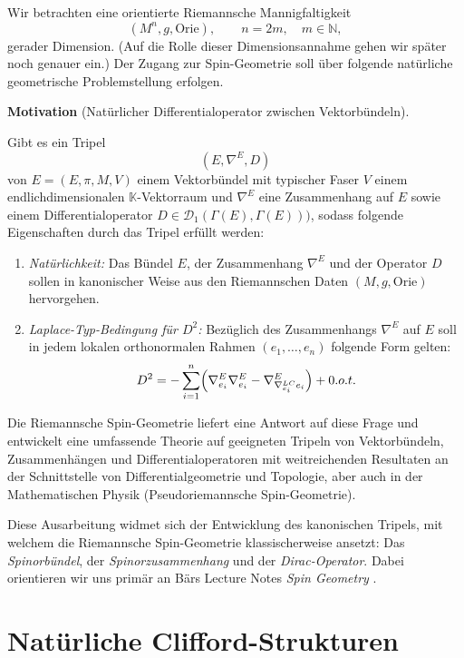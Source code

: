 \documentclass[10pt, letterpaper]{article}
\newcommand{\CustomHeading}[3]{%
  \par\medskip\noindent%
  \textbf{#1 #2} \textnormal{(#3)}.\enskip%
}
\newenvironment{MOT}[2]{\CustomHeading{Motivation}{#1}{#2}}{}
\begin{document}
Wir betrachten eine orientierte Riemannsche Mannigfaltigkeit
\[
(M^n,g,\mathrm{Orie}),
\qquad n=2m,\quad m\in\mathbb N,
\]
gerader Dimension. 
(Auf die Rolle dieser Dimensionsannahme gehen wir später noch genauer ein.) Der Zugang zur Spin-Geometrie soll über folgende natürliche geometrische Problemstellung erfolgen.

\begin{MOT}{}{Natürlicher Differentialoperator zwischen Vektorbündeln}
  Gibt es ein Tripel 
  $$\left( E,\nabla^E, D \right)$$
  von $E=(E,\pi,M,V)$ einem Vektorbündel mit typischer Faser $V$ einem endlichdimensionalen $\mathbb{K}$-Vektorraum und $\nabla^E$ eine Zusammenhang auf $E$ sowie einem Differentialoperator $D\in \mathscr{D}_1(\Gamma(E),\Gamma(E)))$, sodass folgende Eigenschaften durch das Tripel erfüllt werden:
  \begin{enumerate}
    \item \emph{Natürlichkeit:}
    Das Bündel $E$, der Zusammenhang $\nabla^E$ und der Operator $D$ sollen
    in kanonischer Weise aus den Riemannschen Daten $(M,g,\mathrm{Orie})$
    hervorgehen.
    \item \emph{Laplace-Typ-Bedingung für $D^2$:}
    Bezüglich des Zusammenhangs $\nabla^E$ auf $E$ soll in jedem lokalen orthonormalen Rahmen $(e_1,\dots,e_n)$ folgende Form gelten:
    \[
    D^2
    =
    -\sum_{i=1}^n\Bigl(
    \nabla^E_{e_i}\nabla^E_{e_i}
    -\nabla^E_{\nabla^{LC}_{e_i}e_i}
    \Bigr)
    +0.o.t.
    \]
  \end{enumerate}
\end{MOT}
\bigskip 

Die Riemannsche Spin-Geometrie liefert eine Antwort auf diese Frage und entwickelt eine umfassende Theorie auf geeigneten Tripeln von Vektorbündeln, Zusammenhängen und Differentialoperatoren mit weitreichenden Resultaten an der Schnittstelle von Differentialgeometrie und Topologie, aber auch in der Mathematischen Physik (Pseudoriemannsche Spin-Geometrie).


Diese Ausarbeitung widmet sich der Entwicklung des kanonischen Tripels, mit welchem die Riemannsche Spin-Geometrie klassischerweise ansetzt: Das \emph{Spinorbündel}, der \emph{Spinorzusammenhang} und der \emph{Dirac-Operator}. Dabei orientieren wir uns primär an Bärs Lecture Notes \emph{Spin Geometry} \parencite[]{BaerSpin}.


\section{Natürliche Clifford-Strukturen}
\end{document}
